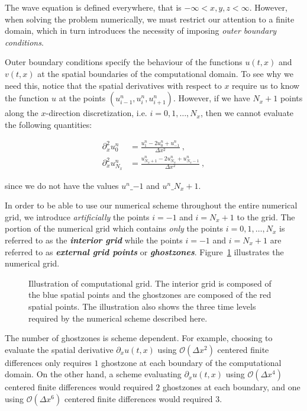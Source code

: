 \documentclass[a4paper,11pt]{article}
\begin{document}
The wave equation is defined everywhere, that is $-\infty<x,y,z<\infty$. However, when solving the problem numerically, we must restrict our attention to a finite domain, which in turn introduces the necessity of imposing \emph{outer boundary conditions}.

Outer boundary conditions specify the behaviour of the functions $u(t,x)$ and $v(t,x)$ at the spatial boundaries of the computational domain. To see why we need this, notice that the spatial derivatives with respect to $x$ require us to know the function $u$ at the points $\left(u_{i-1}^{n},u_{i}^{n},u_{i+1}^{n}\right)$. However, if we have $N_{x}+1$ points along the $x$-direction discretization, i.e. $i=0,1,\dots,N_{x}$, then we cannot evaluate the following quantities:

\begin{equation}
\begin{aligned}
\partial_{x}^{2}u^{n}_{0} &= \frac{u^{n}_{1} - 2u^{n}_{0} + u^{n}_{-1}}{\Delta x^{2}}\ ,\\
\partial_{x}^{2}u^{n}_{N_{x}} &= \frac{u^{n}_{N_{x}+1} - 2u^{n}_{N_{x}} + u^{n}_{N_{x}-1}}{\Delta x^{2}}\ ,
\end{aligned}
\end{equation}

\noindent since we do not have the values $u^{n}\_{-1}$ and $u^{n}\_{N_{x}+1}$.

In order to be able to use our numerical scheme throughout the entire numerical grid, we introduce \emph{artificially} the points $i=-1$ and $i=N_{x}+1$ to the grid. The portion of the numerical grid which contains \emph{only} the points $i=0,1,\dots,N_{x}$ is referred to as the \emph{\textbf{interior grid}} while the points $i=-1$ and $i=N_{x}+1$ are referred to as \emph{\textbf{external grid points}}  or \emph{\textbf{ghostzones}}. Figure~\ref{Figure1} illustrates the numerical grid.

\begin{figure}[ht]
\centering

\caption[Illustration of computational grid.]{Illustration of computational grid. The interior grid is composed of the blue spatial points and the ghostzones are composed of the red spatial points. The illustration also shows the three time levels required by the numerical scheme described here.}
\label{Figure1}
\end{figure}

The number of ghostzones is scheme dependent. For example, choosing to evaluate the spatial derivative $\partial_{x}u(t,x)$ using $\mathcal{O}\left(\Delta x^{2}\right)$ centered finite differences only requires $1$ ghostzone at each boundary of the computational domain. On the other hand, a scheme evaluating $\partial_{x}u(t,x)$ using $\mathcal{O}\left(\Delta x^{4}\right)$ centered finite differences would required $2$ ghostzones at each boundary, and one using $\mathcal{O}\left(\Delta x^{6}\right)$ centered finite differences would required $3$.
\end{document}
